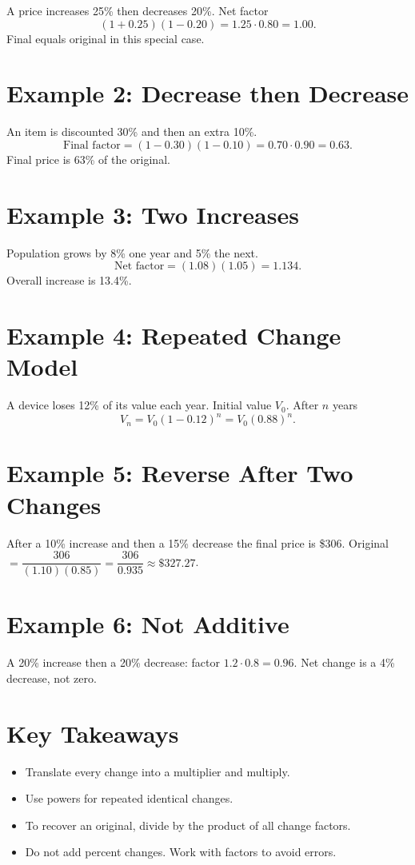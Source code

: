 \documentclass[12pt]{article}
\begin{document}
A price increases 25\% then decreases 20\%. Net factor
\[
(1+0.25)(1-0.20)=1.25\cdot0.80=1.00.
\]
Final equals original in this special case.

\section*{Example 2: Decrease then Decrease}

An item is discounted 30\% and then an extra 10\%.  
\[
\text{Final factor}=(1-0.30)(1-0.10)=0.70\cdot0.90=0.63.
\]
Final price is 63\% of the original.

\section*{Example 3: Two Increases}

Population grows by 8\% one year and 5\% the next.
\[
\text{Net factor}=(1.08)(1.05)=1.134.
\]
Overall increase is 13.4\%.

\section*{Example 4: Repeated Change Model}

A device loses 12\% of its value each year. Initial value \(V_0\). After \(n\) years
\[
V_n=V_0(1-0.12)^n=V_0(0.88)^n.
\]

\section*{Example 5: Reverse After Two Changes}

After a 10\% increase and then a 15\% decrease the final price is \$306.  
Original \(=\dfrac{306}{(1.10)(0.85)}=\dfrac{306}{0.935}\approx \$327.27\).

\section*{Example 6: Not Additive}

A 20\% increase then a 20\% decrease: factor \(1.2\cdot0.8=0.96\).  
Net change is a 4\% decrease, not zero.

\section*{Key Takeaways}
\begin{itemize}
  \item Translate every change into a multiplier and multiply.
  \item Use powers for repeated identical changes.
  \item To recover an original, divide by the product of all change factors.
  \item Do not add percent changes. Work with factors to avoid errors.
\end{itemize}
\end{document}
